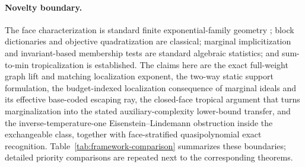 \documentclass{article}
\begin{document}
\paragraph{Novelty boundary.}
The face characterization is standard finite exponential-family geometry
\cite{rauh11,malago11}; block dictionaries and objective quadratization are
classical; marginal implicitization and invariant-based membership tests are
standard algebraic statistics; and sum-to-min tropicalization is established.
The claims here are the exact full-weight graph lift and matching localization
exponent, the two-way static support formulation, the
budget-indexed localization consequence of marginal ideals and its effective
base-coded escaping ray, the closed-face tropical argument that turns
marginalization into the stated auxiliary-complexity lower-bound transfer, and
the inverse-temperature-one Eisenstein--Lindemann obstruction inside the
exchangeable class, together with face-stratified quasipolynomial exact
recognition.
Table~\ref{tab:framework-comparison} summarizes these boundaries; detailed
priority comparisons are repeated next to the corresponding theorems.
\end{document}
